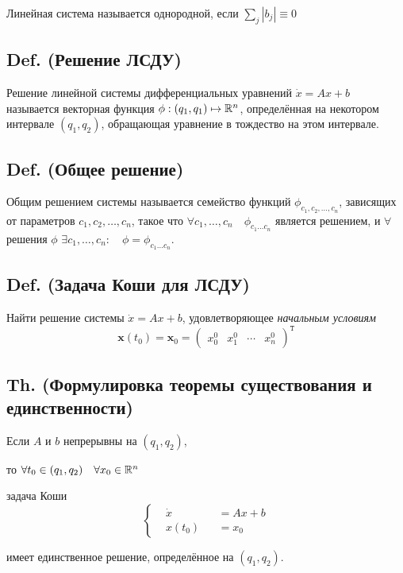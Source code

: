 Линейная система называется однородной, если \(\sum_j |b_j| \equiv 0\)

\subsection{Def. (Решение
ЛСДУ)}\label{def.-ux440ux435ux448ux435ux43dux438ux435-ux43bux441ux434ux443}

Решение линейной системы дифференциальных уравнений \(\dot x = A x + b\)
называется векторная функция \(\phi : (q_1, q_1) \mapsto \mathbb R^n\),
определённая на некотором интервале \((q_1, q_2)\), обращающая уравнение
в тождество на этом интервале.

\subsection{Def. (Общее
решение)}\label{def.-ux43eux431ux449ux435ux435-ux440ux435ux448ux435ux43dux438ux435}

Общим решением системы называется семейство функций
\(\phi_{c_1, c_2, \ldots, c_n}\), зависящих от параметров
\(c_1, c_2, \ldots, c_n\), такое что
\(\forall c_1, \ldots, c_n \quad \phi_{c_1 \ldots c_n}\) является
решением, и \(\forall\) решения \(\phi\)
\(\exists c_1, \ldots, c_n: \quad \phi = \phi_{c_1 \ldots c_n}\).

\subsection{Def. (Задача Коши для
ЛСДУ)}\label{def.-ux437ux430ux434ux430ux447ux430-ux43aux43eux448ux438-ux434ux43bux44f-ux43bux441ux434ux443}

Найти решение системы \(\dot x = A x + b\), удовлетворяющее
\emph{начальным условиям} \[
\mathbf x(t_0) = \mathbf x_0 =
{\begin{pmatrix}
x_0^0 & x_1^0 & \cdots & x_n^0
\end{pmatrix}}^{\mathtt T}\]

\subsection{Th. (Формулировка теоремы существования и
единственности)}\label{th.-ux444ux43eux440ux43cux443ux43bux438ux440ux43eux432ux43aux430-ux442ux435ux43eux440ux435ux43cux44b-ux441ux443ux449ux435ux441ux442ux432ux43eux432ux430ux43dux438ux44f-ux438-ux435ux434ux438ux43dux441ux442ux432ux435ux43dux43dux43eux441ux442ux438}

Если \(A\) и \(b\) непрерывны на \((q_1, q_2)\),

то \(\forall t_0 \in (q_1, q_2) \quad\forall x_0 \in \mathbb R^n\)

задача Коши \[\left\{\begin{aligned}
& \dot x &&= A x + b \\
& x(t_0) &&= x_0
\end{aligned}\right.\]

имеет единственное решение, определённое на \((q_1, q_2)\).
